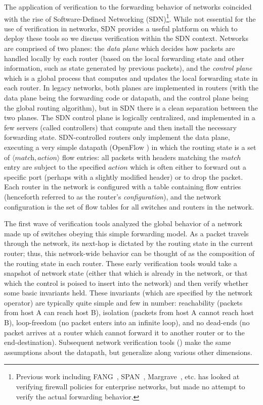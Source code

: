 The application of verification to the forwarding behavior of networks coincided with the rise of Software-Defined Networking (SDN)\footnote{Previous work including FANG~\cite{mayer2000fang}, SPAN~\cite{gupta2009span}, Margrave~\cite{nelson2010margrave}, etc. has looked at verifying firewall policies for enterprise networks, but made no attempt to verify the actual forwarding behavior.}. While not essential for the use of verification in networks, SDN provides a useful platform on which to deploy these tools so we discuss verification within the SDN context. Networks are comprised of two planes: the {\em data plane} which decides how packets are handled locally by each router (based on the local forwarding state and other information, such as state generated by previous packets), and the {\em control plane} which is a global process that computes and updates the local forwarding state in each router. In legacy networks, both planes are implemented in routers (with the data plane being the forwarding code or datapath, and the control plane being the global routing algorithm), but in SDN there is a clean separation between the two planes. The SDN control plane is logically centralized, and implemented in a few servers (called controllers) that compute and then install the necessary forwarding state. SDN-controlled routers only implement the data plane, executing a very simple datapath (OpenFlow \cite{openflow}) in which the routing state is a set of $\langle \textit{match}, \textit{action} \rangle$ flow entries: all packets with headers matching the $match$ entry are subject to the specified $action$ which is often either to forward out a specific port (perhaps with a slightly modified header) or to drop the packet. Each router in the network is configured with a table containing flow entries (henceforth referred to as the router's {\em configuration}), and the network configuration is the set of flow tables for all switches and routers in the network.


The first wave of verification tools \cite{anteater,khurshid2012veriflow,oldhsa,kazemian2013real} analyzed the global behavior of a network made up of switches obeying this simple forwarding model. As a packet travels through the network, its next-hop is dictated by the routing state in the current router; thus, this network-wide behavior can be thought of as the composition of the routing state in each router. These early verification tools would take a snapshot of network state (either that which is already in the network, or that which the control is poised to insert into the network) and then verify whether some basic invariants held. These invariants (which are specified by the network operator) are typically quite simple and few in number: reachability (\eg packets from host A can reach host B), isolation (\eg packets from host A cannot reach host B), loop-freedom (no packet enters into an infinite loop), and no dead-ends (no packet arrives at a router which cannot forward it to another router or to the end-destination). Subsequent network verification tools (\eg \cite{guha2013machine,anderson2014netkat,flowlog, nelson2013balance}) make the same assumptions about the datapath, but generalize along various other dimensions.

